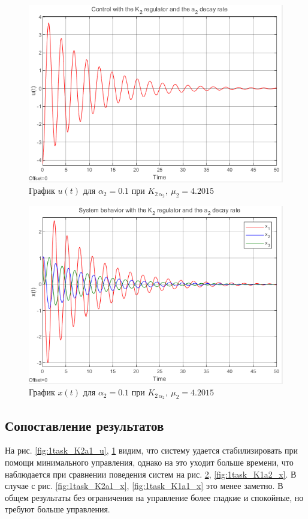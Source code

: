 \documentclass[a4paper, 12pt]{article}
\begin{document}
    \begin{figure}[H]
        \centering
        \includegraphics{1task_K2a2_u.png}
        \captionsetup{skip=0pt}
        \caption{График $u(t)$ для $\alpha_2=0.1$ при $K_{2\,\alpha_2},\ \mu_2=4.2015$}
        \label{fig:1task_K2a2_u}
    \end{figure}
    \begin{figure}[H]
        \centering
        \includegraphics{1task_K2a2_x.png}
        \captionsetup{skip=0pt}
        \caption{График $x(t)$ для $\alpha_2=0.1$ при $K_{2\,\alpha_2},\ \mu_2=4.2015$}
        \label{fig:1task_K2a2_x}
    \end{figure}


    \subsection{Сопоставление результатов}
    На рис. \ref{fig:1task_K2a1_u}, \ref{fig:1task_K2a2_u} видим, что систему удается стабилизировать при помощи минимального управления,
    однако на это уходит больше времени, что наблюдается при сравнении поведения систем на рис. \ref{fig:1task_K2a2_x}, \ref{fig:1task_K1a2_x}.
    В случае с рис. \ref{fig:1task_K2a1_x}, \ref{fig:1task_K1a1_x} это менее заметно. В общем результаты без ограничения на управление более гладкие
    и спокойные, но требуют больше управления.
\end{document}
